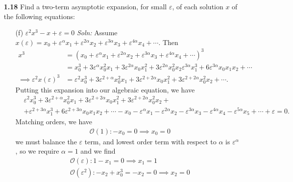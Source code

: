\documentclass{article}
\begin{document}
\begin{itemize}
    \item[\textbf{1.18}] Find a two-term asymptotic expansion, for small $\varepsilon$, of each solution $x$ of the following equations:
    \begin{itemize}
        \item[(f)] $\varepsilon^2x^3 - x + \varepsilon = 0$
        \newline\newline
        \textit{Soln:} Assume $x(\varepsilon) = x_0 + \varepsilon^{\alpha} x_1 + \varepsilon^{2\alpha} x_2 + \varepsilon^{3\alpha} x_3 + \varepsilon^{4\alpha}x_4 + \cdots$. Then
        \begin{align*}
            x^3 &= (x_0 + \varepsilon^{\alpha} x_1 + \varepsilon^{2\alpha} x_2 + \varepsilon^{3\alpha} x_3 + \varepsilon^{4\alpha} x_4 + \cdots)^3\\
            &= x_0^3 + 3\varepsilon^{\alpha} x_0^2x_1 + 3\varepsilon^{2\alpha}x_0x_1^2 + 3\varepsilon^{2\alpha}x_0^2x_2 \varepsilon^{3\alpha}x_1^3 + 6\varepsilon^{3\alpha}x_0x_1x_2 + \cdots \\
            \implies \varepsilon^{2}x(\varepsilon)^3 &= \varepsilon^2x_0^3 + 3\varepsilon^{2 + \alpha}x_0^2x_1 + 3\varepsilon^{2 + 2\alpha}x_0x_1^2 + 3\varepsilon^{2 + 2\alpha}x_0^2x_2 + \cdots.
        \end{align*}
        Putting this expansion into our algebraic equation, we have
        \begin{align*}
            &\varepsilon^2x_0^3 + 3\varepsilon^{2 + \alpha}x_0^2x_1 + 3\varepsilon^{2 + 2\alpha}x_0x_1^2 + 3\varepsilon^{2 + 2\alpha}x_0^2x_2 + \\
            & + \varepsilon^{2 + 3\alpha} x_1^3 + 6\varepsilon^{2 + 3\alpha}x_0x_1x_2 + \cdots - x_0 - \varepsilon^{\alpha} x_1 - \varepsilon^{2\alpha} x_2 - \varepsilon^{3\alpha}x_3 - \varepsilon^{4\alpha}x_4 - \varepsilon^{5\alpha}x_5 + \cdots + \varepsilon = 0.
        \end{align*}
        Matching orders, we have 
        \begin{align*}
            &\mathcal{O}(1): -x_0 = 0 \implies x_0 = 0
        \end{align*}
        we must balance the $\varepsilon$ term, and lowest order term with respect to $\alpha$ is $\varepsilon^{\alpha}$, so we require $\alpha = 1$ and we find
        \begin{align*}
            &\mathcal{O}(\varepsilon): 1 - x_1 = 0 \implies x_1 = 1\\
            &\mathcal{O}(\varepsilon^2): -x_2 + x_0^3 = -x_2 = 0 \implies x_2 = 0\\

\end{align*}
\end{itemize}
\end{itemize}
\end{document}
